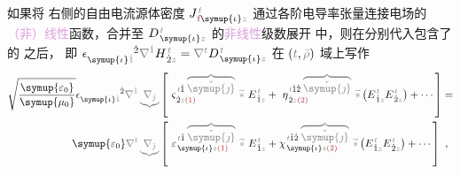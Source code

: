 如果将  右侧的自由电流源体密度 $J^{\;\!\mathcolor{gray}{t}}_{\;\! \textcolor{Maroon}{\text{f}} \symup{\iota}\mathcolor{gray}{z}}$ 通过各阶电导率张量连接电场的\textcolor{Plum}{（非）线性}函数，合并至 $D^{\;\!\mathcolor{gray}{t}}_{\;\! \symup{\iota}\mathcolor{gray}{z}}$ 的\textcolor{Plum}{非线性}级数展开  中，则在分别代入包含了  的  之后， 即 $\epsilon^{\hphantom{\symup{\iota}\dot{1}}\dot{2}}_{\symup{\iota}\mathcolor{gray}{\dot{1}}} \mathcolor{gray}{\nabla^{\dot{1}}} H^{\;\!\mathcolor{gray}{t}}_{\;\! \dot{2}\mathcolor{gray}{z}} = \mathcolor{gray}{\nabla^t} D^{\;\!\mathcolor{gray}{t}}_{\;\! \symup{\iota}\mathcolor{gray}{z}}$ 在 $\left( \mathcolor{gray}{t}, \mathcolor{gray}{\bar{\rho}} \right)$ 域上写作
\clearpage
\vspace*{-4.5em}
\begin{subequations}
\begin{align}
	\sqrt{\frac{\symup{\varepsilon_0}}{\symup{\mu_0}}} \epsilon^{\hphantom{\symup{\iota}\dot{1}}\dot{2}}_{\symup{\iota}\mathcolor{gray}{\dot{1}}} \mathcolor{gray}{\nabla^{\dot{1}}} \mathcolor{gray}{\underbrace{\nabla_{\check{\jmath}}}} &\left[~ \varsigma^{\;\! \mathcolor{gray}{t} \hat{1} \;\! \mathcolor{gray}{\overbrace{\check{\symup{\jmath}}}}}_{\;\! \dot{2} \mathcolor{gray}{z} \textcolor{Maroon}{(1)}} ~\mathcolor{gray}{\widetilde *}~ E^{\;\!\mathcolor{gray}{t}}_{\;\! \hat{1} \mathcolor{gray}{z}} + ~\eta^{\;\! \mathcolor{gray}{t} \hat{1} \hat{2} \;\! \mathcolor{gray}{\overbrace{\check{\symup{\jmath}}}}}_{\;\! \dot{2} \mathcolor{gray}{z} \textcolor{Maroon}{(2)}} ~\mathcolor{gray}{\widetilde *} \left( E^{\;\!\mathcolor{gray}{t}}_{\;\! \hat{1} \mathcolor{gray}{z}} E^{\;\!\mathcolor{gray}{t}}_{\;\! \hat{2} \mathcolor{gray}{z}} \right) + \cdots \right] \label{eq:wave_trho} = \\
	{\symup{\varepsilon_0}} \mathcolor{gray}{\nabla^t} \mathcolor{gray}{\underbrace{\nabla_{\check{\jmath}}}} &\left[~ \varepsilon^{\;\! \mathcolor{gray}{t} \hat{1} \;\! \mathcolor{gray}{\overbrace{\check{\symup{\jmath}}}}}_{\;\! \symup{\iota} \mathcolor{gray}{z} \textcolor{Maroon}{(1)}} ~\mathcolor{gray}{\widetilde *}~ E^{\;\!\mathcolor{gray}{t}}_{\;\! \hat{1} \mathcolor{gray}{z}} + \chi^{\;\! \mathcolor{gray}{t} \hat{1} \hat{2} \;\! \mathcolor{gray}{\overbrace{\check{\symup{\jmath}}}}}_{\;\! \symup{\iota} \mathcolor{gray}{z} \textcolor{Maroon}{(2)}} ~\mathcolor{gray}{\widetilde *} \left( E^{\;\!\mathcolor{gray}{t}}_{\;\! \hat{1} \mathcolor{gray}{z}} E^{\;\!\mathcolor{gray}{t}}_{\;\! \hat{2} \mathcolor{gray}{z}} \right) + \cdots \right]~,
\end{align}
\end{subequations}
